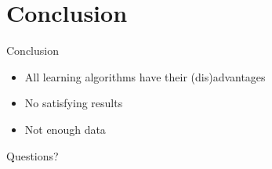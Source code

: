 \documentclass{beamer}
\begin{document}
\section{Conclusion}

\begin{frame}{Conclusion}
\begin{itemize}
\item All learning algorithms have their (dis)advantages
\item No satisfying results
\item Not enough data
\end{itemize}
\end{frame}
\begin{frame}{Questions?}
\end{frame}
\end{document}

